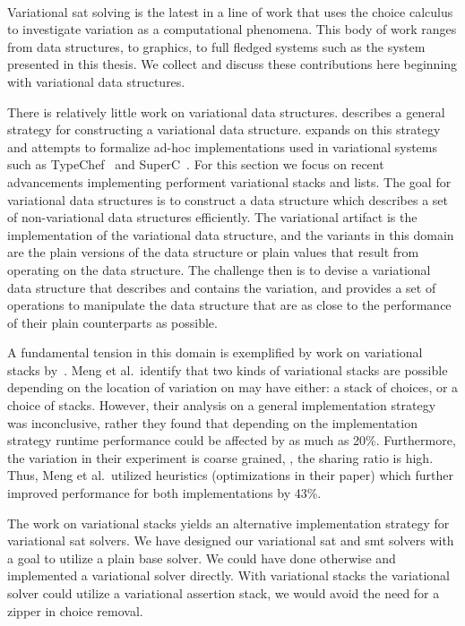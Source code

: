~\label{section:related-work:variational-systems}
%

Variational \ac{sat} solving is the latest in a line of work that uses the
choice calculus to investigate variation as a computational phenomena. This body
of work ranges from data structures, to graphics, to full fledged systems such
as the system presented in this thesis. We collect and discuss these
contributions here beginning with variational data structures.

There is relatively little work on variational data structures.
\citet{EWC13fosd} describes a general strategy for constructing a variational
data structure. \citet{Walk14onward} expands on this strategy and attempts to
formalize ad-hoc implementations used in variational systems such as
TypeChef~\cite{KKHL:FOSD10} and SuperC~\cite{GG:PLDI12}. For this section we
focus on recent advancements implementing performent variational stacks and
lists. The goal for variational data structures is to construct a data structure
which describes a set of non-variational data structures efficiently. The
variational artifact is the implementation of the variational data structure,
and the variants in this domain are the plain versions of the data structure or
plain values that result from operating on the data structure. The challenge
then is to devise a variational data structure that describes and contains the
variation, and provides a set of operations to manipulate the data structure
that are as close to the performance of their plain counterparts as possible.

A fundamental tension in this domain is exemplified by work on variational
stacks by~\citet{MMWWK17vamos}. Meng et al.\ identify that two kinds of
variational stacks are possible depending on the location of variation on may
have either: a stack of choices, or a choice of stacks. However, their analysis
on a general implementation strategy was inconclusive, rather they found that
depending on the implementation strategy runtime performance could be affected
by as much as 20\%. Furthermore, the variation in their experiment is coarse
grained, \ie{}, the sharing ratio is high. Thus, Meng et al.\ utilized
heuristics (optimizations in their paper) which further improved performance for
both implementations by 43\%.

The work on variational stacks yields an alternative implementation strategy for
variational \ac{sat} solvers. We have designed our variational \ac{sat} and
\ac{smt} solvers with a goal to utilize a plain base solver. We could have done
otherwise and implemented a variational solver directly. With variational
stacks the variational solver could utilize a variational assertion
stack, we would avoid the need for a zipper in choice removal.

